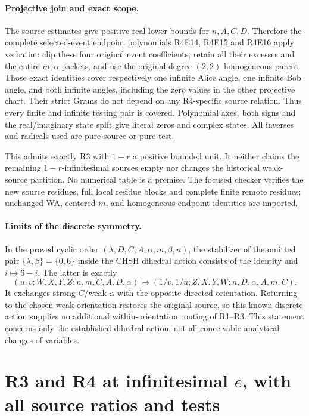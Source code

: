 \paragraph{Projective join and exact scope.}
The source estimates give positive real lower bounds for $n,A,C,D$.
Therefore the complete selected-event endpoint polynomials R4E14,
R4E15 and R4E16 apply verbatim: clip these four original event
coefficients, retain all their excesses and the entire $m,\alpha$
packets, and use the original degree-$(2,2)$ homogeneous parent.
Those exact identities cover respectively one infinite Alice angle,
one infinite Bob angle, and both infinite angles, including the
zero values in the other projective chart. Their strict Grams do
not depend on any R4-specific source relation. Thus every finite
and infinite testing pair is covered. Polynomial axes, both signs
and the real/imaginary state split give literal zeros and complex
states. All inverses and radicals used are pure-source or pure-test.

This admits exactly R3 with $1-r$ a positive bounded unit. It neither
claims the remaining $1-r$-infinitesimal sources empty nor changes
the historical weak-source partition. No numerical table is a
premise. The focused checker verifies the new source residues, full
local residue blocks and complete finite remote residues; unchanged
WA, centered-$m$, and homogeneous endpoint identities are imported.

\paragraph{Limits of the discrete symmetry.}
In the proved cyclic order $(\lambda,D,C,A,\alpha,m,\beta,n)$,
the stabilizer of the omitted pair $\{\lambda,\beta\}=\{0,6\}$
inside the CHSH dihedral action consists of the identity and
$i\mapsto6-i$. The latter is exactly
\[
 (u,v;W,X,Y,Z;n,m,C,A,D,\alpha)
 \longmapsto(1/v,1/u;Z,X,Y,W;n,D,\alpha,A,m,C).
\]
It exchanges strong $C$/weak $\alpha$ with the opposite directed
orientation. Returning to the chosen weak orientation restores the
original source, so this known discrete action supplies no additional
within-orientation routing of R1--R3. This statement concerns only
the established dihedral action, not all conceivable analytical
changes of variables.


\section{\texorpdfstring{R3 and R4 at infinitesimal \(e\), with all source ratios and tests}{R3 and R4 at infinitesimal e, with all source ratios and tests}}
\label{component:p1de8b5ffab69}

